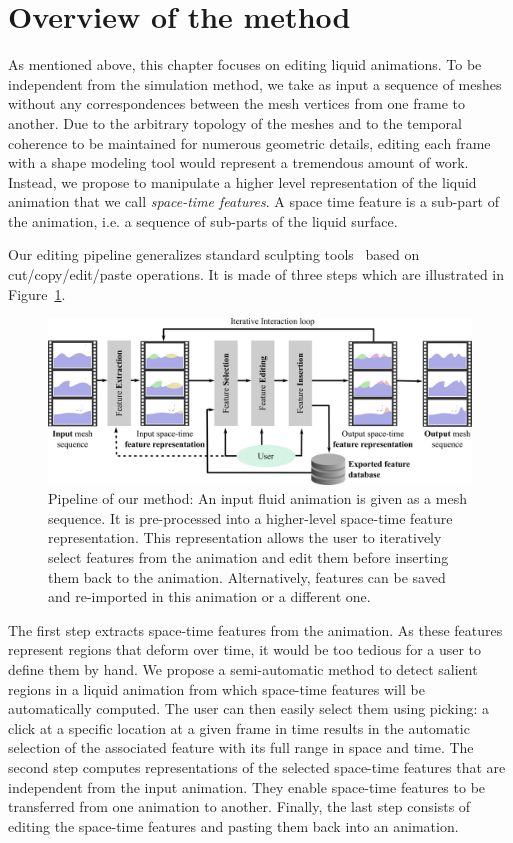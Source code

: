\section{Overview of the method}\label{sec:overview}
As mentioned above, this chapter focuses on editing liquid animations.
To be independent from the simulation method, we take as input a sequence of meshes without any correspondences between the mesh vertices from one frame to another. 
Due to the arbitrary topology of the meshes and to the temporal coherence to be maintained for numerous geometric details, editing each frame with a shape modeling tool would represent a tremendous amount of work.
Instead, we propose to manipulate a higher level representation of the liquid animation that we call \emph{space-time features}. A space time feature is a sub-part of the animation, i.e. a sequence of sub-parts of the liquid surface. 

Our editing pipeline generalizes standard sculpting tools~\cite{Ferley2000} based on cut/copy/edit/paste operations.
It is made of three steps which are illustrated in Figure~\ref{fig:overview}. 
\begin{figure}[!h]
	\centering
	\includegraphics[width=\linewidth]{images/fluidsculpting-mig2016/overview_2.png}
	\caption[Fluid sculpting: Overview]{
		Pipeline of our method: 
		An input fluid animation is given as a mesh sequence. 
		It is pre-processed into a higher-level space-time feature representation. 
		This representation allows the user to iteratively select features from the animation and edit them before inserting them back to the animation. 
		Alternatively, features can be saved and re-imported in this animation or a different one. }
	\label{fig:overview}
\end{figure}

The first step extracts space-time features from the animation. As these features represent regions that deform over time, it would be too tedious for a user to define them by hand. We propose a semi-automatic method to detect salient regions in a liquid animation from which space-time features will be automatically computed. 
The user can then easily select them using picking: a click at a specific location at a given frame in time results in the automatic selection of the associated feature with its full range in space and time.
The second step computes representations of the selected space-time features that are independent from the input animation.
They enable space-time features to be transferred from one animation to another. 
Finally, the last step consists of editing the space-time features and pasting them back into an animation.


